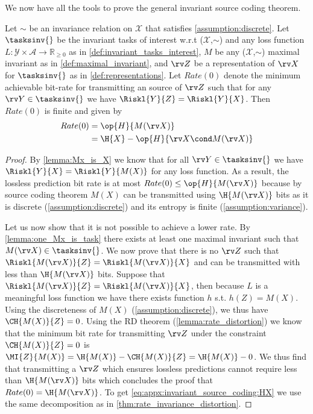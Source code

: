 \documentclass[final]{article}
\begin{document}
We now have all the tools to prove the general invariant source coding theorem.

\begin{theorem}\label{thm:invariant_source_coding}
Let $\sim$ be an invariance relation on $\mathcal{X}$ that satisfies \cref{assumption:discrete}.
Let $\tasksinv{}$ be the invariant tasks of interest w.r.t ($\mathcal{X}$,$\sim$) and any loss function $L : \mathcal{Y} \times \mathcal{A} \to \mathbb{R}_{\geq 0}$ as in \cref{def:invariant_tasks_interest}, $M$ be any ($\mathcal{X}$,$\sim$) maximal invariant as in \cref{def:maximal_invariant}, and $\rv Z$ be a representation of $\rv X$ for $\tasksinv{}$ as in \cref{def:representations}.
Let $Rate(0)$ denote the minimum achievable bit-rate for transmitting an \iid source of $\rv Z$ such that for any $\rv Y \in \tasksinv{}$ we have $\Riskl{Y}{Z} = \Riskl{Y}{X}$.
Then $Rate(0)$  is finite and given by
\begin{align}
Rate(0) 
&= \op{H}{M(\rv X)} \label{eq:appx:invariant_source_coding:HMX} \\
&= \H{X} - \op{H}{\rv X \cond M(\rv X)}  \label{eq:appx:invariant_source_coding:HX}
\end{align}
\end{theorem}
\begin{proof}
By \cref{lemma:Mx_is_X}  we know that for all $\rv Y \in \tasksinv{}$ we have $ \Riskl{Y}{X} = \Riskl{Y}{M(X)}$  for any loss function.
As a result, the lossless prediction bit rate is at most $Rate(0) \leq \op{H}{M(\rv X)}$ because by  source coding theorem  $M(X)$ can be transmitted using $\H{M(\rv X)}$ bits as it is discrete (\cref{assumption:discrete}) and its entropy is finite (\cref{assumption:variance}).
 
Let us now show that it is not possible to achieve a lower rate.
By \cref{lemma:one_Mx_is_task} there exists at least one maximal invariant such that $M(\rv X) \in \tasksinv{}$.
We now prove that there is no $\rv Z$ such that $\Riskl{M(\rv X)}{Z} = \Riskl{M(\rv X)}{X}$ and can be transmitted with less than $\H{M(\rv X)}$ bits.
Suppose that $\Riskl{M(\rv X)}{Z} = \Riskl{M(\rv X)}{X}$,  then because $L$ is a meaningful loss function we have there exists  function $h$ s.t. $h(Z) = M(X)$.
Using the discreteness of $M(X)$  (\cref{assumption:discrete}), we thus have $\CH{M(X)}{Z}=0$.
Using the RD theorem (\cref{lemma:rate_distortion}) we know that the minimum bit rate for transmitting $\rv Z$ under the constraint $\CH{M(X)}{Z}=0$ is $\MI{Z}{M(X)} = \H{M(X)} - \CH{M(X)}{Z} = \H{M(X)} - 0$.
We thus find that transmitting a $\rv Z$ which ensures lossless predictions cannot require less  than $\H{M(\rv X)}$ bits which concludes the proof that $Rate(0) = \H{M(\rv X)}$.
To get \cref{eq:appx:invariant_source_coding:HX} we use the same decomposition as in \cref{thm:rate_invariance_distortion}.
\end{proof}
\end{document}
